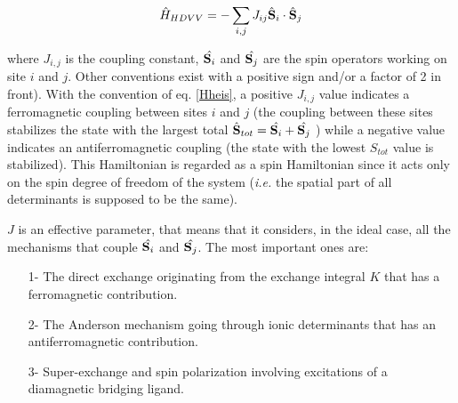 \documentclass[12pt]{report}
\numberwithin{equation}{section}
\begin{document}
\begin{equation}\label{Hheis}
    \hat{H}_{HDVV}=-\sum_{i,j} J_{ij} \hat{\vb S}_i \cdot \hat{\vb S}_j
\end{equation}

\noindent where $J_{i,j}$ is the coupling constant, $\hat{\vb S_i}$ and $\hat{\vb S_j}$ are the spin operators working on site $i$ and $j$. Other conventions exist with a positive sign and/or a factor of 2 in front).  
With the convention of eq. \ref{Hheis}, a positive $J_{i,j}$ value indicates a ferromagnetic coupling between sites $i$ and $j$ (the coupling between these sites stabilizes the state with the largest total $\hat{\vb S}_{tot}=\hat{\vb S_i}+\hat{\vb S_j}$ ) while a negative value indicates an antiferromagnetic coupling (the state with the lowest $S_{tot}$ value is stabilized).
This Hamiltonian is regarded as a spin Hamiltonian since it acts only on the spin degree of freedom of the system (\textit{i.e.} the spatial part of all determinants is supposed to be the same).

$J$  is an effective parameter, that means that it considers, in the ideal case, all the mechanisms that couple $\hat{\vb S_i}$ and $\hat{\vb S_j}$. The most important ones are:
\begin{itemize}
    \item[1-] The direct exchange originating from the exchange integral $K$ that has a ferromagnetic contribution.
    \item[2-] The Anderson mechanism going through ionic determinants that has an antiferromagnetic contribution.
    \item[3-] Super-exchange and spin polarization involving excitations of a diamagnetic bridging ligand.
\end{itemize}
\end{document}
